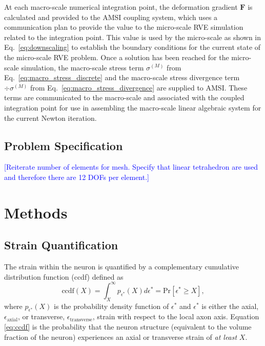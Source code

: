 \documentclass[]{interact}
\newcommand{\blue}[1]{\textcolor{blue}{[#1]}}
\begin{document}
At each macro-scale numerical integration point, the deformation gradient $\pmb{F}$ is calculated and provided to the AMSI coupling system, which uses a communication plan to provide the value to the micro-scale RVE simulation related to the integration point. This value is used by the micro-scale as shown in Eq.\ \eqref{eq:downscaling} to establish the boundary conditions for the current state of the micro-scale RVE problem. Once a solution has been reached for the micro-scale simulation, the macro-scale stress term $\sigma^{(M)}$ from Eq.\ \eqref{eq:macro_stress_discrete} and the macro-scale stress divergence term $\div \sigma^{(M)}$ from Eq.\ \eqref{eq:macro_stress_divergence} are supplied to AMSI. These terms are communicated to the macro-scale and associated with the coupled integration point for use in assembling the macro-scale linear algebraic system for the current Newton iteration.


\subsection{Problem Specification}\label{sec:specification}
\blue{Reiterate number of elements for mesh. Specify that linear tetrahedron are used and therefore there are 12 DOFs per element.}

\section{Methods}
\label{sec:methods}

\subsection{Strain Quantification}
\label{subsec:strain_quant}
The strain within the neuron is quantified by a complementary cumulative distribution function (ccdf) defined as 
%
\begin{equation}
\text{ccdf}(X) = \int_{X}^{\infty} p_{\epsilon^*}(X)d\epsilon^* = \text{Pr}[ \epsilon^*\ge X],
\label{eq:ccdf}
\end{equation}
%
where $p_{\epsilon^*}(X)$ is the probability density function of $\epsilon^*$ and $\epsilon^*$ is either the axial, $\epsilon_{\text{axial}}$, or transverse, $\epsilon_{\text{transverse}}$, strain with respect to the local axon axis. Equation \ref{eq:ccdf} is the probability that the neuron structure (equivalent to the volume fraction of the neuron) experiences an axial or transverse strain of \textit{at least} $X$. 
\end{document}
